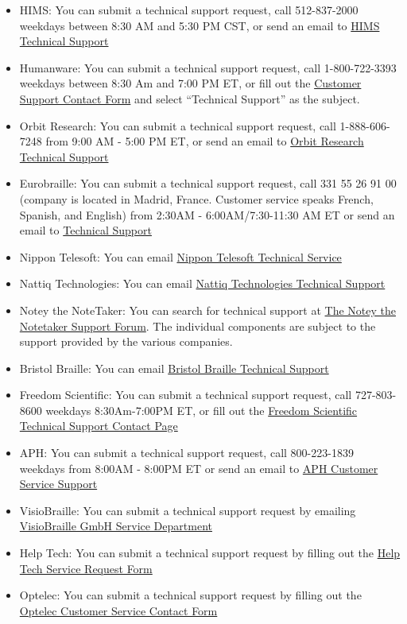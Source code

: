 \begin{itemize}[leftmargin=*]
 \item HIMS: You can submit a technical support request, call 512-837-2000 weekdays between 8:30 AM and 5:30 PM CST, or send an email to \href{mailto:support@hims-inc.com}{HIMS Technical Support} 
 \item Humanware: You can submit a technical support request, call 1-800-722-3393 weekdays between 8:30 Am and 7:00 PM ET, or fill out the \href{http://store.humanware.com/hus/contact/}{Customer Support Contact Form} and select ``Technical Support'' as the subject. 
 \item Orbit Research: You can submit a technical support request, call 1-888-606-7248 from 9:00 AM - 5:00 PM ET, or send an email to \href{mailto:techsupport@orbitresearch.com}{Orbit Research Technical Support} 
 \item Eurobraille: You can submit a technical support request, call 331 55 26 91 00 (company is located in Madrid, France. Customer service speaks French, Spanish, and English) from 2:30AM - 6:00AM/7:30-11:30 AM ET or send an email to \href{mailto:econtact@eurobraille.fr}{Technical Support} 
 \item Nippon Telesoft: You can email \href{mailto:ts-email@telesoft.co.jp}{Nippon Telesoft Technical Service} 
 \item Nattiq Technologies: You can email \href{mailto:info@nattiq.com}{Nattiq Technologies Technical Support} 
 \item Notey the NoteTaker: You can search for technical support at \href{http://notey-project.com/2023/03/31/notey-forum-tech-support/}{The Notey the Notetaker Support Forum}. The individual components are subject to the support provided by the various companies. 
 \item Bristol Braille: You can email \href{mailto:support@bristolbraille.org}{Bristol Braille Technical Support} 
 \item Freedom Scientific: You can submit a technical support request, call 727-803-8600 weekdays 8:30Am-7:00PM ET, or fill out the \href{http://support.freedomscientific.com/Forms/TechSupport}{Freedom Scientific Technical Support Contact Page} 
 \item APH: You can submit a technical support request, call 800-223-1839 weekdays from 8:00AM - 8:00PM ET or send an email to \href{mailto:cs@aph.org}{APH Customer Service Support} 
 \item VisioBraille: You can submit a technical support request by emailing \href{mailto:service@visiobraille.de}{VisioBraille GmbH Service Department} 
 \item Help Tech: You can submit a technical support request by filling out the \href{http://www.helptech.eu/contact}{Help Tech Service Request Form} 
 \item Optelec: You can submit a technical support request by filling out the \href{http://in.optelec.com/dealers/contactform}{Optelec Customer Service Contact Form} 
\end{itemize}


